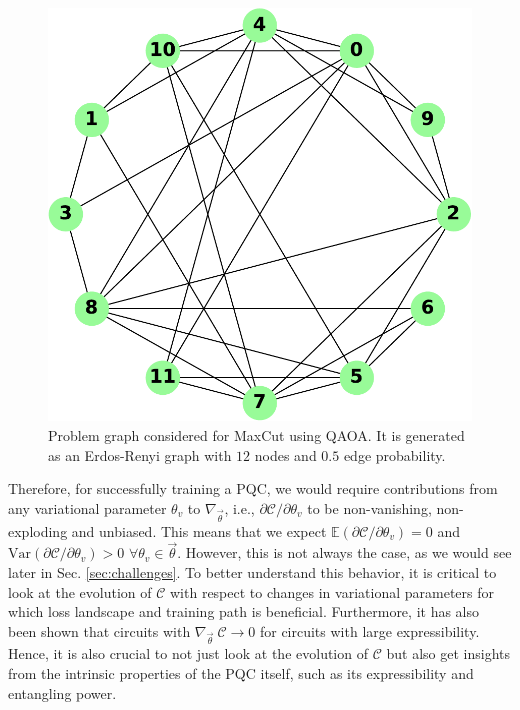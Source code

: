 \begin{figure}[ht]
    \centering
    \includegraphics[width=0.3\linewidth]{figures/qleet/qaoa-graph.pdf}
    \caption[Problem graph for QAOA]{Problem graph considered for MaxCut using QAOA. It is generated as an Erdos-Renyi graph with $12$ nodes and $0.5$ edge probability.}
    \label{fig:qoao-maxcut-graph}
\end{figure}
Therefore, for successfully training a PQC, we would require contributions from any variational parameter $\theta_v$ to $\nabla_{\vec{\theta}}$, i.e., $\partial\mathcal{C}/\partial\theta_v$ to be non-vanishing, non-exploding and unbiased. This means that we expect $\mathbb{E}(\partial\mathcal{C}/\partial\theta_v) = 0$ and $\text{Var}(\partial\mathcal{C}/\partial\theta_v) > 0$  $\forall \theta_v \in \vec{\theta}$. However, this is not always the case, as we would see later in Sec. \ref{sec:challenges}. To better understand this behavior, it is critical to look at the evolution of $\mathcal{C}$ with respect to changes in variational parameters for which loss landscape and training path is beneficial. Furthermore, it has also been shown that circuits with $\nabla_{\vec{\theta}}\ \mathcal{C} \rightarrow 0$ for circuits with large expressibility. Hence, it is also crucial to not just look at the evolution of $\mathcal{C}$ but also get insights from the intrinsic properties of the PQC itself, such as its expressibility and entangling power.

